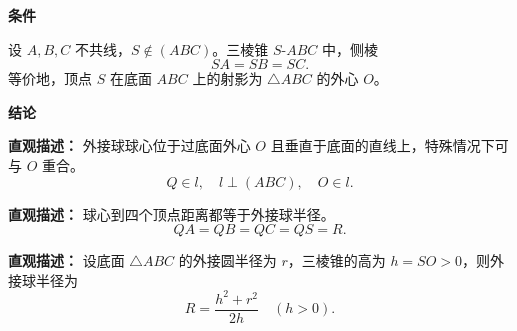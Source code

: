 \begin{statementbox}

	\textbf{\textcolor{CStatement}{条件}}
	\begin{description}[style=nextline, leftmargin=2.8em, labelsep=0.5em, itemsep=0.35em]
		\item[\textbf{\textcolor{CStatement}{条件 1（侧棱相等）：}}] 设 $A,B,C$ 不共线，$S\notin(ABC)$。三棱锥 $S$-$ABC$ 中，侧棱
		      \[
			      SA=SB=SC.
		      \]
		      等价地，顶点 $S$ 在底面 $ABC$ 上的射影为 $\triangle ABC$ 的外心 $O$。
	\end{description}

	\textbf{\textcolor{CStatement}{结论}}
	\begin{description}[style=nextline, leftmargin=2.8em, labelsep=0.5em, itemsep=0.45em]
		\item[\textbf{\textcolor{CStatement}{结论一（球心位置）：}}]
		      \textbf{\textcolor{CStatement}{直观描述：}} 外接球球心位于过底面外心 $O$ 且垂直于底面的直线上，特殊情况下可与 $O$ 重合。
		      \[
			      Q \in l,\quad l \perp (ABC),\quad O \in l .
		      \]

		\item[\textbf{\textcolor{CStatement}{结论二（等距条件）：}}]
		      \textbf{\textcolor{CStatement}{直观描述：}} 球心到四个顶点距离都等于外接球半径。
		      \[
			      QA = QB = QC = QS = R .
		      \]

		\item[\textbf{\textcolor{CStatement}{常见变形（半径公式）：}}]
		      \textbf{\textcolor{CStatement}{直观描述：}} 设底面 $\triangle ABC$ 的外接圆半径为 $r$，三棱锥的高为 $h=SO>0$，则外接球半径为
		      \[
			      R = \frac{h^{2} + r^{2}}{2h}\quad (h > 0).
		      \]
	\end{description}

\end{statementbox}